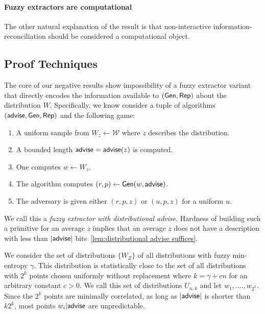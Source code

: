 \paragraph{Fuzzy extractors are computational} The other natural explanation of the result is that non-interactive information-reconciliation should be considered a computational object. 

\subsection{Proof Techniques}
The core of our negative results show impossibility of a fuzzy extractor variant that directly encodes the information available to $({\mathsf{Gen}}, {\mathsf{Rep}})$ about the distribution $W$.  Specifically, we know consider a tuple of algorithms $({\mathsf{advise}}, {\mathsf{Gen}}, {\mathsf{Rep}})$ and the following game:
\begin{enumerate}
\itemsep0em
\item A uniform sample from $W_z\leftarrow \mathcal{W}$ where $z$ describes the distribution.
\item A bounded length ${\mathsf{advise}} = {\mathsf{advise}}(z)$ is computed.
\item One computes $w\leftarrow W_z$.
\item The algorithm computes $(r, p)\leftarrow {\ensuremath{\mathsf{Gen}}}(w, {\mathsf{advise}})$.
\item The adversary is given either $(r, p, z)$ or $(u, p, z)$ for a uniform $u$.
\end{enumerate}
We call this a \emph{fuzzy extractor with distributional advise}.  Hardness of building such a primitive for an average $z$ implies that an average $z$ does not have a description with less than $|{\mathsf{advise}}|$ bits~\ref{lem:distributional advise suffices}. 

We consider the set of distributions $\{W_Z\}$ of all distributions with fuzzy min-entropy $\gamma$.  This distribution is statistically close to the set of all distributions with $2^k$ points chosen uniformly without replacement where $k = \gamma +cn$ for an arbitrary constant $c>0$.  We call this set of distributions $U_{n,k}$ and let $w_1,...., w_{2^k}$.  Since the  $2^k$ points are minimally correlated, as long as $|{\mathsf{advise}}|$ is shorter than $k2^k$, most points $w_i | {\mathsf{advise}}$ are unpredictable.  

